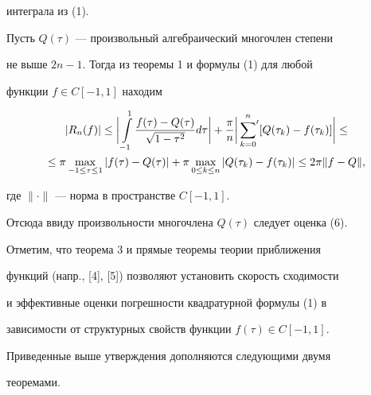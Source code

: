 интеграла из (1).





Пусть $Q( \tau)$ --- произвольный алгебраический многочлен степени


не выше $2n-1$. Тогда из теоремы 1 и формулы (1) для любой


функции $f \in C[-1,1] $ находим


\begin{multline*}


| R_n(f) | \leq \bigg| \int \limits_{-1}^1 \frac{f( \tau)-Q( \tau)}{


\sqrt{1- \tau^2}} d \tau \bigg| + \frac{ \pi}{n}


\bigg| \sideset{}{'}\sum_{k=0}^n 


[Q( \tau_k) - f( \tau_k)] \bigg| \leq \\


%


\leq \pi \max_{-1 \leq \tau \leq 1} | f( \tau) - Q( \tau) | +


\pi \max_{0 \leq k \leq n} | Q( \tau_k)-f( \tau_k) | \leq 2


\pi \| f-Q \|,


\end{multline*}


где $ \| \cdot \| $ --- норма в пространстве $ C[-1,1] $.


Отсюда ввиду произвольности многочлена $ Q( \tau) $ следует оценка (6).





Отметим, что теорема 3 и прямые теоремы теории приближения


функций (напр., [4], [5]) позволяют установить скорость сходимости


и эффективные оценки погрешности квадратурной формулы (1) в


зависимости от структурных свойств функции $f(\tau) \in C[-1,1]$.





Приведенные выше утверждения дополняются следующими двумя


теоремами.






